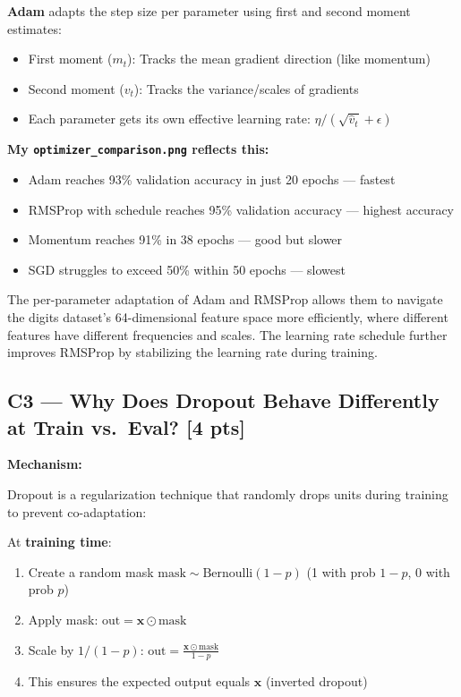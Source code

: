 \documentclass[11pt,a4paper]{article}
\begin{document}
\textbf{Adam} adapts the step size per parameter using first and second moment estimates:
\begin{itemize}
    \item First moment ($m_t$): Tracks the mean gradient direction (like momentum)
    \item Second moment ($v_t$): Tracks the variance/scales of gradients
    \item Each parameter gets its own effective learning rate: $\eta / (\sqrt{\hat{v}_t} + \epsilon)$
\end{itemize}

\textbf{My \texttt{optimizer\_comparison.png} reflects this:}
\begin{itemize}
    \item Adam reaches 93\% validation accuracy in just 20 epochs — fastest
    \item RMSProp with schedule reaches 95\% validation accuracy — highest accuracy
    \item Momentum reaches 91\% in 38 epochs — good but slower
    \item SGD struggles to exceed 50\% within 50 epochs — slowest
\end{itemize}

The per-parameter adaptation of Adam and RMSProp allows them to navigate the digits dataset's 64-dimensional feature space more efficiently, where different features have different frequencies and scales. The learning rate schedule further improves RMSProp by stabilizing the learning rate during training.

\subsection*{C3 --- Why Does Dropout Behave Differently at Train vs.\ Eval? \hfill [4 pts]}

\textbf{Mechanism:}

Dropout is a regularization technique that randomly drops units during training to prevent co-adaptation:

At \textbf{training time}:
\begin{enumerate}
    \item Create a random mask $\text{mask} \sim \text{Bernoulli}(1-p)$ (1 with prob $1-p$, 0 with prob $p$)
    \item Apply mask: $\text{out} = \mathbf{x} \odot \text{mask}$
    \item Scale by $1/(1-p)$: $\text{out} = \frac{\mathbf{x} \odot \text{mask}}{1-p}$
    \item This ensures the expected output equals $\mathbf{x}$ (inverted dropout)
\end{enumerate}
\end{document}
